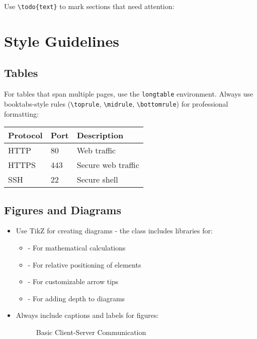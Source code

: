 \documentclass[12pt]{labmanual}
\begin{document}
Use \verb|\todo{text}| to mark sections that need attention:


\section{Style Guidelines}

\subsection{Tables}

For tables that span multiple pages, use the \texttt{longtable} environment. Always use booktabs-style rules (\verb|\toprule|, \verb|\midrule|, \verb|\bottomrule|) for professional formatting:

\begin{longtable}{lll}
\toprule
Protocol & Port & Description \\
\midrule
HTTP & 80 & Web traffic \\
HTTPS & 443 & Secure web traffic \\
SSH & 22 & Secure shell \\
\bottomrule
\end{longtable}

\subsection{Figures and Diagrams}

\begin{itemize}
\item Use TikZ for creating diagrams - the class includes libraries for:
  \begin{itemize}
  \item {} - For mathematical calculations
  \item {} - For relative positioning of elements
  \item {} - For customizable arrow tips
  \item {} - For adding depth to diagrams
  \end{itemize}
\item Always include captions and labels for figures:

\begin{figure}[htbp]
\centering
{}
\caption{Basic Client-Server Communication}
\label{fig:client-server}
\end{figure}
\end{itemize}
\end{document}
